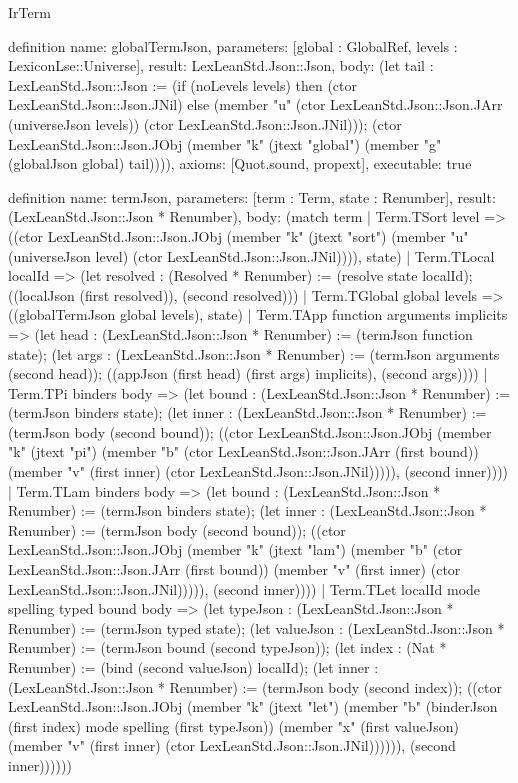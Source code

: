 \begin{lexlean}{IrTerm}
\begin{semanticmodule}
definition{
  name: globalTermJson,
  parameters: [global : GlobalRef, levels : LexiconLse::Universe],
  result: LexLeanStd.Json::Json,
  body: (let tail : LexLeanStd.Json::Json := (if (noLevels levels) then (ctor LexLeanStd.Json::Json.JNil) else (member "u" (ctor LexLeanStd.Json::Json.JArr (universeJson levels)) (ctor LexLeanStd.Json::Json.JNil))); (ctor LexLeanStd.Json::Json.JObj (member "k" (jtext "global") (member "g" (globalJson global) tail)))),
  axioms: [Quot.sound, propext],
  executable: true
}

definition{
  name: termJson,
  parameters: [term : Term, state : Renumber],
  result: (LexLeanStd.Json::Json * Renumber),
  body: (match term
    | Term.TSort level => ((ctor LexLeanStd.Json::Json.JObj (member "k" (jtext "sort") (member "u" (universeJson level) (ctor LexLeanStd.Json::Json.JNil)))), state)
    | Term.TLocal localId => (let resolved : (Resolved * Renumber) := (resolve state localId); ((localJson (first resolved)), (second resolved)))
    | Term.TGlobal global levels => ((globalTermJson global levels), state)
    | Term.TApp function arguments implicits => (let head : (LexLeanStd.Json::Json * Renumber) := (termJson function state); (let args : (LexLeanStd.Json::Json * Renumber) := (termJson arguments (second head)); ((appJson (first head) (first args) implicits), (second args))))
    | Term.TPi binders body => (let bound : (LexLeanStd.Json::Json * Renumber) := (termJson binders state); (let inner : (LexLeanStd.Json::Json * Renumber) := (termJson body (second bound)); ((ctor LexLeanStd.Json::Json.JObj (member "k" (jtext "pi") (member "b" (ctor LexLeanStd.Json::Json.JArr (first bound)) (member "v" (first inner) (ctor LexLeanStd.Json::Json.JNil))))), (second inner))))
    | Term.TLam binders body => (let bound : (LexLeanStd.Json::Json * Renumber) := (termJson binders state); (let inner : (LexLeanStd.Json::Json * Renumber) := (termJson body (second bound)); ((ctor LexLeanStd.Json::Json.JObj (member "k" (jtext "lam") (member "b" (ctor LexLeanStd.Json::Json.JArr (first bound)) (member "v" (first inner) (ctor LexLeanStd.Json::Json.JNil))))), (second inner))))
    | Term.TLet localId mode spelling typed bound body => (let typeJson : (LexLeanStd.Json::Json * Renumber) := (termJson typed state); (let valueJson : (LexLeanStd.Json::Json * Renumber) := (termJson bound (second typeJson)); (let index : (Nat * Renumber) := (bind (second valueJson) localId); (let inner : (LexLeanStd.Json::Json * Renumber) := (termJson body (second index)); ((ctor LexLeanStd.Json::Json.JObj (member "k" (jtext "let") (member "b" (binderJson (first index) mode spelling (first typeJson)) (member "x" (first valueJson) (member "v" (first inner) (ctor LexLeanStd.Json::Json.JNil)))))), (second inner))))))
}
\end{semanticmodule}
\end{lexlean}
